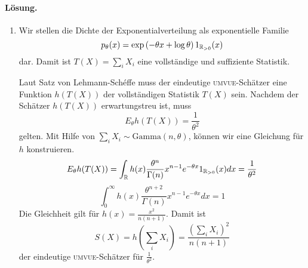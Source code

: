 \paragraph*{Lösung.} 
\begin{enumerate}
    \item
Wir stellen die Dichte der Exponentialverteilung als exponentielle Familie 
\begin{equation*}
    p_\theta(x) = \exp \left( -\theta x + \log \theta \right) 1_{\mathbb R_{>0}}(x)
\end{equation*}
dar. Damit ist $T(X)=\sum_{i}^{} X_i$ eine vollständige und suffiziente Statistik.

Laut Satz von Lehmann-Sch\'effe muss der eindeutige \textsc{umvue}-Schätzer
eine Funktion $h(T(X))$ der vollständigen Statistik $T(X)$ sein. Nachdem der
Schätzer $h(T(X))$ erwartungstreu ist, muss
\begin{equation*}
    E_\theta h(T(X)) = \frac{1}{\theta^2}
\end{equation*}
gelten. Mit Hilfe von $\sum_{i}^{} X_i \sim \textrm{Gamma}(n,\theta)$, können
wir eine Gleichung für $h$ konstruieren.
\begin{equation*}
    E_\theta h(T(X)) =  \int_{\mathbb R} h(x) \frac{\theta^n}{\Gamma(n)} x^{n-1}e^{-\theta x} 1_{\mathbb R_{>0}}(x) dx =\frac{1}{\theta^2} 
\end{equation*}
\begin{equation*}
    \int_{0}^{\infty} h(x) \frac{\theta^{n+2}}{\Gamma(n)}  x^{n-1} e^{-\theta x} dx = 1
\end{equation*}
Die Gleichheit gilt für $h(x)= \frac{x^2}{n(n+1)}$. Damit ist 
\begin{equation*}
    S(X) = h\left( \sum_{i}^{} X_i \right) = \frac{\left( \sum_{i}^{} X_i \right)^2}{n(n+1)}
\end{equation*}
der eindeutige \textsc{umvue}-Schätzer für $\frac{1}{\theta^2}$.


\end{enumerate}
